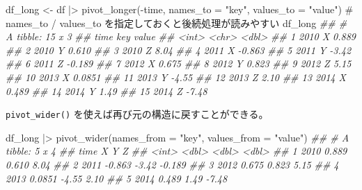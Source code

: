 \documentclass[
  letterpaper,
  xelatex,
  ja=standard, xelatex]{bxjsbook}
\newenvironment{Shaded}{\begin{snugshade}}{\end{snugshade}}
\newcommand{\AttributeTok}[1]{\textcolor[rgb]{0.40,0.45,0.13}{#1}}
\newcommand{\CommentTok}[1]{\textcolor[rgb]{0.37,0.37,0.37}{#1}}
\newcommand{\DocumentationTok}[1]{\textcolor[rgb]{0.37,0.37,0.37}{\textit{#1}}}
\newcommand{\FunctionTok}[1]{\textcolor[rgb]{0.28,0.35,0.67}{#1}}
\newcommand{\NormalTok}[1]{\textcolor[rgb]{0.00,0.23,0.31}{#1}}
\newcommand{\OtherTok}[1]{\textcolor[rgb]{0.00,0.23,0.31}{#1}}
\newcommand{\SpecialCharTok}[1]{\textcolor[rgb]{0.37,0.37,0.37}{#1}}
\newcommand{\StringTok}[1]{\textcolor[rgb]{0.13,0.47,0.30}{#1}}
\begin{document}
\begin{Shaded}
\begin{Highlighting}[]
\NormalTok{df\_long }\OtherTok{\textless{}{-}}\NormalTok{ df }\SpecialCharTok{|\textgreater{}} 
  \FunctionTok{pivot\_longer}\NormalTok{(}\SpecialCharTok{{-}}\NormalTok{time, }\AttributeTok{names\_to =} \StringTok{"key"}\NormalTok{, }\AttributeTok{values\_to =} \StringTok{"value"}\NormalTok{)}
\CommentTok{\# names\_to / values\_to を指定しておくと後続処理が読みやすい}
\NormalTok{df\_long}
\DocumentationTok{\#\# \# A tibble: 15 x 3}
\DocumentationTok{\#\#     time key     value}
\DocumentationTok{\#\#    \textless{}int\textgreater{} \textless{}chr\textgreater{}   \textless{}dbl\textgreater{}}
\DocumentationTok{\#\#  1  2010 X      0.889 }
\DocumentationTok{\#\#  2  2010 Y      0.610 }
\DocumentationTok{\#\#  3  2010 Z      8.04  }
\DocumentationTok{\#\#  4  2011 X     {-}0.863 }
\DocumentationTok{\#\#  5  2011 Y     {-}3.42  }
\DocumentationTok{\#\#  6  2011 Z     {-}0.189 }
\DocumentationTok{\#\#  7  2012 X      0.675 }
\DocumentationTok{\#\#  8  2012 Y      0.823 }
\DocumentationTok{\#\#  9  2012 Z      5.15  }
\DocumentationTok{\#\# 10  2013 X      0.0851}
\DocumentationTok{\#\# 11  2013 Y     {-}4.55  }
\DocumentationTok{\#\# 12  2013 Z      2.10  }
\DocumentationTok{\#\# 13  2014 X      0.489 }
\DocumentationTok{\#\# 14  2014 Y      1.49  }
\DocumentationTok{\#\# 15  2014 Z     {-}7.48}
\end{Highlighting}
\end{Shaded}

\texttt{pivot\_wider()} を使えば再び元の構造に戻すことができる。

\begin{Shaded}
\begin{Highlighting}[]
\NormalTok{df\_long }\SpecialCharTok{|\textgreater{}} 
  \FunctionTok{pivot\_wider}\NormalTok{(}\AttributeTok{names\_from =} \StringTok{"key"}\NormalTok{, }\AttributeTok{values\_from =} \StringTok{"value"}\NormalTok{)}
\DocumentationTok{\#\# \# A tibble: 5 x 4}
\DocumentationTok{\#\#    time       X      Y      Z}
\DocumentationTok{\#\#   \textless{}int\textgreater{}   \textless{}dbl\textgreater{}  \textless{}dbl\textgreater{}  \textless{}dbl\textgreater{}}
\DocumentationTok{\#\# 1  2010  0.889   0.610  8.04 }
\DocumentationTok{\#\# 2  2011 {-}0.863  {-}3.42  {-}0.189}
\DocumentationTok{\#\# 3  2012  0.675   0.823  5.15 }
\DocumentationTok{\#\# 4  2013  0.0851 {-}4.55   2.10 }
\DocumentationTok{\#\# 5  2014  0.489   1.49  {-}7.48}
\end{Highlighting}
\end{Shaded}
\end{document}
